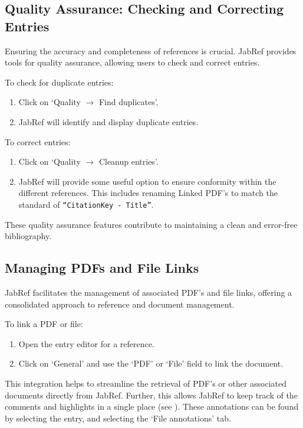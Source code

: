 		\subsection{Quality Assurance: Checking and Correcting Entries}
			Ensuring the accuracy and completeness of references is crucial. 
			JabRef provides tools for quality assurance, allowing users to check and correct entries.

			To check for duplicate entries:
			\begin{enumerate}
				\item Click on `Quality $\rightarrow$ Find duplicates'.
				\item JabRef will identify and display duplicate entries.
			\end{enumerate}
			
			To correct entries:
			\begin{enumerate}
				\item Click on `Quality $\rightarrow$ Cleanup entries'.
				\item JabRef will provide some useful option to ensure conformity within the different references.
					This includes renaming Linked PDF's to match the standard of \texttt{``CitationKey - Title''}.
			\end{enumerate}
						
			These quality assurance features contribute to maintaining a clean and error-free bibliography.

		\subsection{Managing PDFs and File Links}
			JabRef facilitates the management of associated PDF's and file links, offering a consolidated approach to reference and document management.

			To link a PDF or file:
			\begin{enumerate}
				\item Open the entry editor for a reference.
				\item Click on `General' and use the `PDF' or `File' field to link the document.
			\end{enumerate}
			This integration helps to streamline the retrieval of PDF's or other associated documents directly from JabRef.
			Further, this allows JabRef to keep track of the comments and highlights in a single place (see ).
			These annotations can be found by selecting the entry, and selecting the `File annotations' tab.

